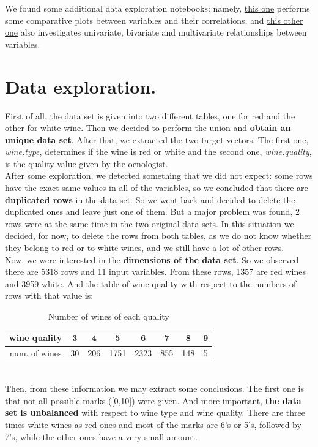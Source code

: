 \documentclass[10pt]{article}
\begin{document}
We found some additional data exploration notebooks: namely, \href{https://rstudio-pubs-static.s3.amazonaws.com/57835_c4ace81da9dc45438ad0c286bcbb4224.html}{this one} performs some comparative plots between variables and their correlations, and \href{http://rstudio-pubs-static.s3.amazonaws.com/219996_9cc8cf9f2e7e41fe8912454c3ad2685a.html}{this other one} also investigates univariate, bivariate and multivariate relationships between variables.
\section{Data exploration.}
First of all, the data set is given into two different tables, one for red and the other for white wine. Then we decided to perform the union and \textbf{obtain an unique data set}. After that, we extracted the two target vectors. The first one, \textit{wine.type}, determines if the wine is red or white and the second one, \textit{wine.quality}, is the quality value given by the oenologist. \\

After some exploration, we detected something that we did not expect: some rows have the exact same values in all of the variables, so we concluded that there are \textbf{duplicated rows} in the data set. So we went back and decided to delete the duplicated ones and leave just one of them. But a major problem was found, 2 rows were at the same time in the two original data sets. In this situation we decided, for now, to delete the rows from both tables, as we do not know whether they belong to red or to white wines, and we still have a lot of other rows. \\

Now, we were interested in the \textbf{dimensions of the data set}. So we observed there are 5318 rows and 11 input variables. From these rows, 1357 are red wines and 3959 white. And the table of wine quality with respect to the numbers of rows with that value is:
\begin{table}[H]
\caption{Number of wines of each quality}
\centering
\begin{tabular}{|c|c|c|c|c|c|c|c|}
\hline
wine quality  & 3  & 4   & 5    & 6    & 7    & 8   & 9 \\ \hline
num. of wines & 30 & 206 & 1751 & 2323 & 855  & 148 & 5 \\ \hline
\end{tabular}
\end{table}
\ \\
Then, from these information we may extract some conclusions. The first one is that not all possible marks ([0,10]) were given. And more important, \textbf{the data set is unbalanced} with respect to wine type and wine quality. There are three times white wines as red ones and most of the marks are 6's or 5's, followed by 7's, while the other ones have a very small amount. \\
\end{document}
